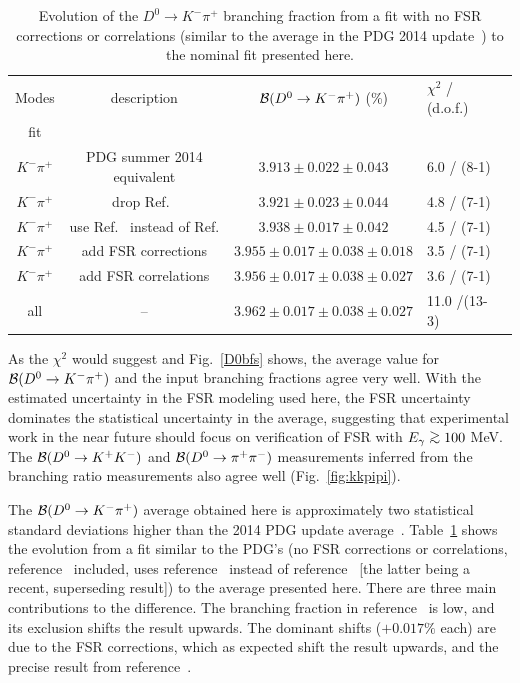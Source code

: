\begin{table}[b]
  \centering 
  \caption{Evolution of the $D^0\to K^-\pi^+$ branching fraction from a fit with
  no FSR corrections or correlations (similar to the average in the %
  PDG 2014 update~\cite{PDG_2014}) to the nominal fit presented
here.}\label{tab:fit_evolution}
\begin{tabular}{cccll}
\hline\hline
Modes &  description                       & ${\cal B}(D^0\to K^-\pi^+)$ (\%)           & $\chi^2$ / (d.o.f.) \\
fit        &                               &                                       & \\ \hline
$K^-\pi^+$ & PDG summer 2014 equivalent    & $3.913 \pm 0.022 \pm 0.043 $ & 6.0 / (8-1)\\
$K^-\pi^+$ & drop Ref.~\cite{Coan:1997ye}  & $3.921 \pm 0.023 \pm 0.044$           & 4.8 / (7-1)\\
$K^-\pi^+$ & use Ref.~\cite{Bonvicini:2013vxi} instead of Ref.\cite{Dobbs:2007zt}  & $3.938 \pm 0.017 \pm 0.042$ & 4.5 / (7-1)\\
$K^-\pi^+$ & add FSR corrections           & $3.955 \pm 0.017 \pm 0.038 \pm 0.018$ & 3.5 / (7-1)\\
$K^-\pi^+$ & add FSR correlations          & $3.956 \pm 0.017 \pm 0.038 \pm 0.027$ & 3.6 / (7-1)\\
all        & --   & $3.962 \pm 0.017 \pm 0.038 \pm 0.027$ &11.0 /(13-3) \\
\hline
\end{tabular}
\end{table}

As the $\chi^2$ would suggest and Fig.~\ref{D0bfs} shows, the average 
value for ${\cal B}(D^0\to K^-\pi^+)$ and
the input branching fractions agree very well.  With the estimated 
uncertainty in the FSR modeling used here,
the FSR uncertainty dominates the statistical uncertainty 
in the average, suggesting that experimental
work in the near future should focus on verification of FSR with 
$E_\gamma \simge 100$ MeV.  The ${\cal B}(D^0\to K^+K^-)$ and 
${\cal B}(D^0\to \pi^+\pi^-)$ measurements inferred
from the branching ratio measurements also agree well 
(Fig.~\ref{fig:kkpipi}).

The ${\cal B}(D^0\to K^-\pi^+)$ average obtained here is 
approximately two statistical standard deviations higher than the
2014 PDG update average~\cite{PDG_2014}. 
Table~\ref{tab:fit_evolution} shows the evolution from a
fit similar to the PDG's (no FSR corrections or correlations, 
reference~\cite{Coan:1997ye}
included, uses reference~\cite{Dobbs:2007zt} instead of reference~\cite{Bonvicini:2013vxi} [the latter being a recent, superseding result]) to the average presented here.
There are three main contributions to the difference. The branching 
fraction in reference~\cite{Coan:1997ye} is
low, and its exclusion shifts the result upwards. The dominant shifts
($+0.017\%$ each) are due to the FSR corrections, which as
expected shift the result upwards, and the precise result from
reference~\cite{Bonvicini:2013vxi}.

